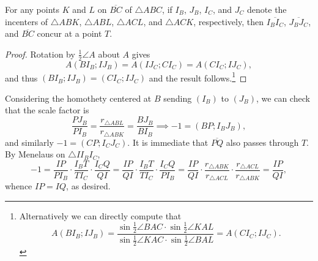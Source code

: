 \begin{boxlemma*}
    For any points $K$ and $L$ on $\overline{BC}$ of $\triangle ABC$, if $I_B$, $J_B$, $I_C$, and $J_C$ denote the incenters of $\triangle ABK$, $\triangle ABL$, $\triangle ACL$, and $\triangle ACK$, respectively, then $\overline{I_BI_C}$, $\overline{J_BJ_C}$, and $\overline{BC}$ concur at a point $T$.
\end{boxlemma*}
\begin{proof}
    Rotation by $\tfrac12\angle A$ about $A$ gives \[A(BI_B;IJ_B)=A(IJ_C;CI_C)=A(CI_C;IJ_C),\]
    and thus $(BI_B;IJ_B)=(CI_C;IJ_C)$ and the result follows.\footnote{Alternatively we can directly compute that \[A(BI_B;IJ_B)=\frac{\sin\tfrac12\angle BAC\cdot\sin\tfrac12\angle KAL}{\sin\tfrac12\angle KAC\cdot\sin\tfrac12\angle BAL}=A(CI_C;IJ_C).\]}
\end{proof}

Considering the homothety centered at $B$ sending $(I_B)$ to $(J_B)$, we can check that the scale factor is \[\frac{PJ_B}{PI_B}=\frac{r_{\triangle ABL}}{r_{\triangle ABK}}=\frac{BJ_B}{BI_B}\implies -1=(BP;I_BJ_B),\]
and similarly $-1=(CP;I_CJ_C)$. It is immediate that $\overline{PQ}$ also passes through $T$. By Menelaus on $\triangle II_BI_C$, \[-1=\frac{IP}{PI_B}\cdot\frac{I_BT}{TI_C}\cdot\frac{I_CQ}{QI}=\frac{IP}{QI}\cdot\frac{I_BT}{TI_C}\cdot\frac{I_CQ}{PI_B}=\frac{IP}{QI}\cdot\frac{r_{\triangle ABK}}{r_{\triangle ACL}}\cdot\frac{r_{\triangle ACL}}{r_{\triangle ABK}}=\frac{IP}{QI},\]
whence $IP=IQ$, as desired.
